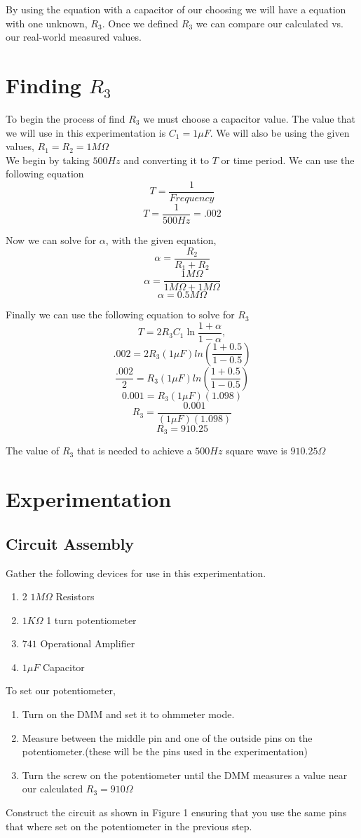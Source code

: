 \documentclass[12pt]{article}
\begin{document}
By using the equation with a capacitor of our choosing we will have a equation with one unknown, $R_3$. Once we defined $R_3$ we can compare our calculated vs. our real-world measured values.

\section{Finding $R_3$}
To begin the process of find $R_3$ we must choose a capacitor value. The value that we will use in this experimentation is $C_1 = 1\mu F$. We will also be using the given values, $R_1=R_2=1M\Omega$\\

We begin by taking $500Hz$ and converting it to $T$ or time period. We can use the following equation
$$T = \frac{1}{Frequency}$$
$$T= \frac{1}{500Hz} = .002$$

Now we can solve for $\alpha$, with the given equation,
$$\alpha = \frac{R_2}{R_1 + R_2}$$
$$\alpha = \frac{1M\Omega}{1M\Omega+1M\Omega}$$
$$\alpha = 0.5M\Omega$$

Finally we can use the following equation to solve for $R_3$
$$ T = 2R_3C_1 \ln{\frac{1+\alpha}{1-\alpha}}, $$
$$.002=2R_3(1\mu F)ln(\frac{1+0.5}{1-0.5})$$
$$\frac{.002}{2}=R_3(1\mu F)ln(\frac{1+0.5}{1-0.5})$$
$$0.001=R_3(1\mu F)(1.098)$$
$$R_3 = \frac{0.001}{(1\mu F)(1.098)}$$
$$R_3 = 910.25$$

The value of $R_3$ that is needed to achieve a $500Hz$ square wave is $910.25\Omega$
\newpage
\section{Experimentation}
\subsection{Circuit Assembly}
 Gather the following devices for use in this experimentation.
	\begin{enumerate}
		\item 2 $1M\Omega$ Resistors
		\item $1K\Omega$ 1 turn potentiometer
		\item $741$ Operational Amplifier
		\item $1\mu F$ Capacitor
	\end{enumerate}
To set our potentiometer,
\begin{enumerate}
	\item Turn on the DMM and set it to ohmmeter mode.
	\item Measure between the middle pin and one of the outside pins on the potentiometer.(these will be the pins used in the experimentation)
	\item Turn the screw on the potentiometer until the DMM measures a value near our calculated $R_3=910\Omega$
\end{enumerate}
Construct the circuit as shown in Figure 1 ensuring that you use the same pins that where set on the potentiometer in the previous step.
\end{document}
